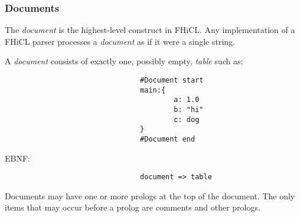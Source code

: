 \documentclass{article}
\begin{document}
                \subsubsection{Documents}
                        The \emph{document} is the highest-level construct 
                        in FHiCL.
                        Any implementation of a FHiCL parser
                        processes a \emph{document}
                        as if it were a single string.

                        A \emph{document} consists of exactly one,
                        possibly empty,
                        \emph{table} such as:
                        \begin{verbatim}
                                #Document start
                                main:{
                                        a: 1.0
                                        b: "hi"
                                        c: dog
                                }
                                #Document end
                        \end{verbatim}  
                        \vspace{1mm}
                        EBNF:
                        \begin{verbatim}
                                document => table
                        \end{verbatim}
                        \par
                        Documents may have one or more prologs at the top of the document.
                        The only items that may occur before a prolog are comments and other prologs.
                        
\end{document}
